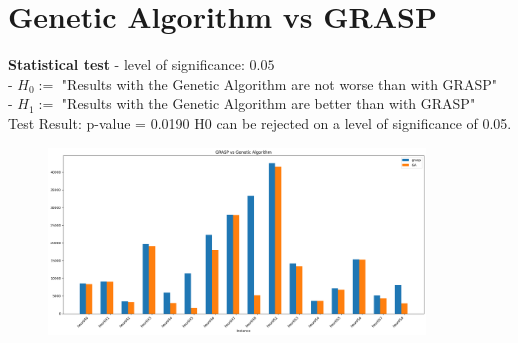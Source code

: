 \documentclass[a4paper,12pt]{article}
\begin{document}

\newpage
\section*{Genetic Algorithm vs GRASP}
\textbf{Statistical test}
- level of significance: $0.05$\\
- $H_0:=$ "Results with the Genetic Algorithm are not worse than with GRASP"\\
- $H_1:=$ "Results with the Genetic Algorithm are better than with GRASP"\\

\noindent
Test Result:
p-value = 0.0190
H0 can be rejected on a level of significance of 0.05.

\begin{figure}[H]
\centering
\includegraphics[width=10cm]{graphics/grasp vs ga.png}
\end{figure}
\end{document}
